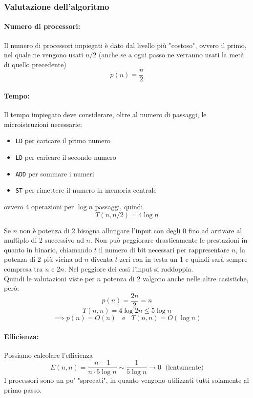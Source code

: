 \newpage

\subsubsection{Valutazione dell'algoritmo}
\paragraph{Numero di processori:} Il numero di processori impiegati è dato dal livello più "costoso", ovvero il primo, nel quale ne vengono usati $n/2$ (anche se a ogni passo ne verranno usati la metà di quello precedente)
$$ p(n) = \frac{n}{2} $$

\paragraph{Tempo:} Il tempo impiegato deve considerare, oltre al numero di passaggi, le microistruzioni necessarie:
\begin{itemize}
	\item \texttt{LD} per caricare il primo numero
	\item \texttt{LD} per caricare il secondo numero
	\item \texttt{ADD} per sommare i numeri
	\item \texttt{ST} per rimettere il numero in memoria centrale
\end{itemize}
ovvero $4$ operazioni per $\log n$ passaggi, quindi
$$ T(n, n/2) = 4 \log n $$

Se $n$ non è potenza di 2 bisogna allungare l'input con degli $0$ fino ad arrivare al multiplo di 2 successivo ad $n$. Non può peggiorare drasticamente le prestazioni in quanto in binario, chiamando $t$ il numero di bit necessari per rappresentare $n$, la potenza di 2 più vicina ad $n$ diventa $t$ zeri con in testa un 1 e quindi sarà sempre compresa tra $n$ e $2n$. Nel peggiore dei casi l'input si raddoppia. \\

Quindi le valutazioni viste per $n$ potenza di 2 valgono anche nelle altre casistiche, però:
$$ p(n) = \frac{2n}{2} = n $$
$$ T(n,n) = 4 \log 2n \leq 5 \log n$$
$$ \implies p(n) = O(n) \;\;\text{ e } \;\; T(n,n) = O(\log n)$$

\paragraph{Efficienza:} Possiamo calcolare l'efficienza
$$ E(n,n) = \frac{n-1}{n \cdot 5 \log n} \sim \frac{1}{5 \log n} \rightarrow 0 \;\text{ (lentamente)}$$
I processori sono un po' "sprecati", in quanto vengono utilizzati tutti solamente al primo passo.\\

